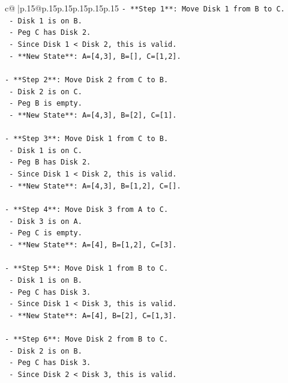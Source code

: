 \documentclass{article}
\begin{document}
{\begin{supertabular}{c@{$\;$}|p{.15\linewidth}@{}p{.15\linewidth}p{.15\linewidth}p{.15\linewidth}p{.15\linewidth}p{.15\linewidth}}
{{{\texttt{{-} **Step 1**: Move Disk 1 from B to C.} \\
\texttt{  {-} Disk 1 is on B.} \\
\texttt{  {-} Peg C has Disk 2.} \\
\texttt{  {-} Since Disk 1 < Disk 2, this is valid.} \\
\texttt{  {-} **New State**: A={[}4,3{]}, B={[}{]}, C={[}1,2{]}.} \\
\\ 
\texttt{{-} **Step 2**: Move Disk 2 from C to B.} \\
\texttt{  {-} Disk 2 is on C.} \\
\texttt{  {-} Peg B is empty.} \\
\texttt{  {-} **New State**: A={[}4,3{]}, B={[}2{]}, C={[}1{]}.} \\
\\ 
\texttt{{-} **Step 3**: Move Disk 1 from C to B.} \\
\texttt{  {-} Disk 1 is on C.} \\
\texttt{  {-} Peg B has Disk 2.} \\
\texttt{  {-} Since Disk 1 < Disk 2, this is valid.} \\
\texttt{  {-} **New State**: A={[}4,3{]}, B={[}1,2{]}, C={[}{]}.} \\
\\ 
\texttt{{-} **Step 4**: Move Disk 3 from A to C.} \\
\texttt{  {-} Disk 3 is on A.} \\
\texttt{  {-} Peg C is empty.} \\
\texttt{  {-} **New State**: A={[}4{]}, B={[}1,2{]}, C={[}3{]}.} \\
\\ 
\texttt{{-} **Step 5**: Move Disk 1 from B to C.} \\
\texttt{  {-} Disk 1 is on B.} \\
\texttt{  {-} Peg C has Disk 3.} \\
\texttt{  {-} Since Disk 1 < Disk 3, this is valid.} \\
\texttt{  {-} **New State**: A={[}4{]}, B={[}2{]}, C={[}1,3{]}.} \\
\\ 
\texttt{{-} **Step 6**: Move Disk 2 from B to C.} \\
\texttt{  {-} Disk 2 is on B.} \\
\texttt{  {-} Peg C has Disk 3.} \\
\texttt{  {-} Since Disk 2 < Disk 3, this is valid.} \\
}}}
\end{supertabular}}
\end{document}
